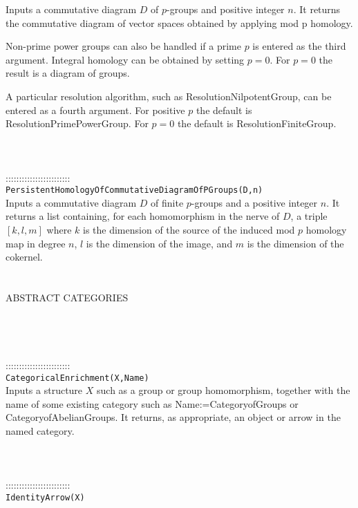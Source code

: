 \documentclass[a4paper,11pt]{report}
\begin{document}
{ Inputs a commutative diagram $D$ of $p$-groups and positive integer $n$. It returns the commutative diagram of vector spaces obtained by applying mod
p homology. 

 Non-prime power groups can also be handled if a prime $p$ is entered as the third argument. Integral homology can be obtained by setting $p=0$. For $p=0$ the result is a diagram of groups. 

 A particular resolution algorithm, such as ResolutionNilpotentGroup, can be
entered as a fourth argument. For positive $p$ the default is ResolutionPrimePowerGroup. For $p=0$ the default is ResolutionFiniteGroup. \\
 \\
 \\
 \\
 ::::::::::::::::::::::::\\
 \texttt{PersistentHomologyOfCommutativeDiagramOfPGroups(D,n) }\\
 

 Inputs a commutative diagram $D$ of finite $p$-groups and a positive integer $n$. It returns a list containing, for each homomorphism in the nerve of $D$, a triple $[k,l,m]$ where $k$ is the dimension of the source of the induced mod $p$ homology map in degree $n$, $l$ is the dimension of the image, and $m$ is the dimension of the cokernel. \\
 \\
 \\
 \textsc{ABSTRACT CATEGORIES} \\
\\
 \\
 \\
 \\
 ::::::::::::::::::::::::\\
 \texttt{CategoricalEnrichment(X,Name) }\\
 

 Inputs a structure $X$ such as a group or group homomorphism, together with the name of some existing
category such as Name:=Category{\textunderscore}of{\textunderscore}Groups or
Category{\textunderscore}of{\textunderscore}Abelian{\textunderscore}Groups. It
returns, as appropriate, an object or arrow in the named category. \\
 \\
 \\
 \\
 ::::::::::::::::::::::::\\
 \texttt{IdentityArrow(X) }\\
 

}
\end{document}
